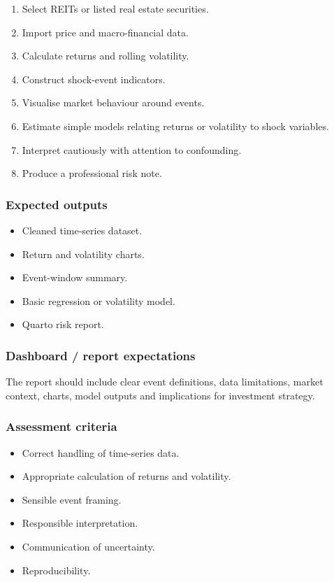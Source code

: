 \documentclass[
  a4paper,
]{article}
\providecommand{\tightlist}{%
  \setlength{\itemsep}{0pt}\setlength{\parskip}{0pt}}
\begin{document}
\begin{enumerate}
\def\labelenumi{\arabic{enumi}.}
\tightlist
\item
  Select REITs or listed real estate securities.
\item
  Import price and macro-financial data.
\item
  Calculate returns and rolling volatility.
\item
  Construct shock-event indicators.
\item
  Visualise market behaviour around events.
\item
  Estimate simple models relating returns or volatility to shock
  variables.
\item
  Interpret cautiously with attention to confounding.
\item
  Produce a professional risk note.
\end{enumerate}

\subsubsection{Expected outputs}\label{expected-outputs-2}

\begin{itemize}
\tightlist
\item
  Cleaned time-series dataset.
\item
  Return and volatility charts.
\item
  Event-window summary.
\item
  Basic regression or volatility model.
\item
  Quarto risk report.
\end{itemize}

\subsubsection{Dashboard / report
expectations}\label{dashboard-report-expectations-2}

The report should include clear event definitions, data limitations,
market context, charts, model outputs and implications for investment
strategy.

\subsubsection{Assessment criteria}\label{assessment-criteria-2}

\begin{itemize}
\tightlist
\item
  Correct handling of time-series data.
\item
  Appropriate calculation of returns and volatility.
\item
  Sensible event framing.
\item
  Responsible interpretation.
\item
  Communication of uncertainty.
\item
  Reproducibility.
\end{itemize}
\end{document}
